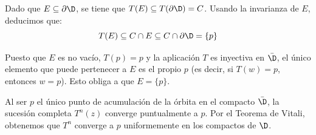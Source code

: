 Dado que $E \subseteq \partial \D$, se tiene que $T(E) \subseteq T(\partial \D) = C$. Usando la invarianza de $E$, deducimos que:
\[
T(E) \subseteq C \cap E \subseteq C \cap \partial \D = \{p\}
\]

Puesto que $E$ es no vacío, $T(p) = p$ y la aplicación $T$ es inyectiva en $\bar{\D}$, el único elemento que puede pertenecer a $E$ es el propio $p$ (es decir, si $T(w) = p$, entonces $w = p$). Esto obliga a que $E = \{p\}$.

Al ser $p$ el único punto de acumulación de la órbita en el compacto $\bar{\D}$, la sucesión completa $T^n(z)$ converge puntualmente a $p$. Por el Teorema de Vitali, obtenemos que $T^n$ converge a $p$ uniformemente en los compactos de $\D$.
